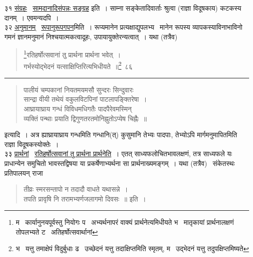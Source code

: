 \documentclass[11pt, openany]{book}
\begin{document}
३१ \underline{संग्रहः} \textendash\ \underline{सामदानादिसंपन्नः सङ्ग्रह} इति~। साम्ना सङ्केतादिवार्ताः श्रुत्वा (राज्ञा विदूषकाय) कटकस्य दानम्~। एवमन्यदपि~।\\

३२ \underline{अनुमानम्} \textendash\ \underline{रूपानुरूपगपन}मिति~। रूप्यमानेन प्रत्यक्षाद्युपलभ्य \textendash\ मानेन रूपस्य व्यापकस्याविनाभाविनो गमनं ज्ञानमनुमानं निश्चयात्मकत्वादूहः, उपायायुक्तेरन्यत्वात्~। यथा (तत्रैव) \textendash


\newpage
\lfoot{}

\begin{quote}
{\na \renewcommand{\thefootnote}{1}\footnote{म \textendash\ कार्यानुनयपूर्वस्तु नियोगः प \textendash\ अभ्यर्थनापरं वाक्यं प्रार्थनेत्यमिधीयते भ \textendash\ मातृकायां प्रार्थनालक्षणं तोपलभ्यते ट \textendash\ अतिहर्षोत्सवार्थानां}रतिहर्षोत्सवानां तु प्रार्थना प्रार्थना भवेत्~।\\
गर्भस्योद्भेदनं यत्साक्षिप्तिरित्यभिधीयते~॥\renewcommand{\thefootnote}{2}\footnote{भ \textendash\ यत्तु तमाक्षेपं विदुर्बुधाः ढ \textendash\ उच्छेदनं यत्तु तदाक्षिप्तमिति स्मृतम्, म \textendash\ उद्भेदनं यत्तु तदुपक्षिप्तमिष्यते}~८६}
\end{quote}

\hrule

\begin{quote}
{\qt पालीयं चम्पकानां नियतमयमसौ सुन्दरः सिन्दुवारः\\
सान्द्रा वीयी तथेयं वकुलविटपिनां पाटलापङ्क्तिरेषा~।\\
आघ्रायाघ्राय गन्धं विविधमधिगतैः पादपैरेवमस्मिन्\\
व्यक्तिं पन्थाः प्रयाति द्विगुणतरतमोनिह्नुतोऽप्येष चिह्नैः~॥}
\end{quote}

\noindent
इत्यादि~। अत्र ह्याघ्रायाघ्राय गन्धमिति गन्धानि(त्) कुसुमानि तेभ्यः पादपाः, तेभ्योऽपि मार्गमनुमापितमिति राज्ञा विदूषकस्योक्तेः~।\\

३३ \underline{प्रार्थनां} \textendash\ \underline{रतिहर्षोत्सवानां तु प्रार्थना प्रार्थनेति}~। एतत् साध्यफलोचितभावलक्षणं, तत्र साध्यफले यः प्राधान्येन समुचितो भावस्तद्विषया या प्रकर्षेणाभ्यर्थना सा प्रार्थनाख्यमङ्गम्~। यथा (तत्रैव) \textendash\ संकेतस्थः प्रतिपालयन् राजा \textendash

\begin{quote}
{\qt तीव्रः स्मरसन्तापो न तदादौ वाधते यथासन्ने~।\\
तपति प्रावृषि नि तरामभ्यर्णजलागमो दिवसः~॥} इति~।
\end{quote}
\end{document}
